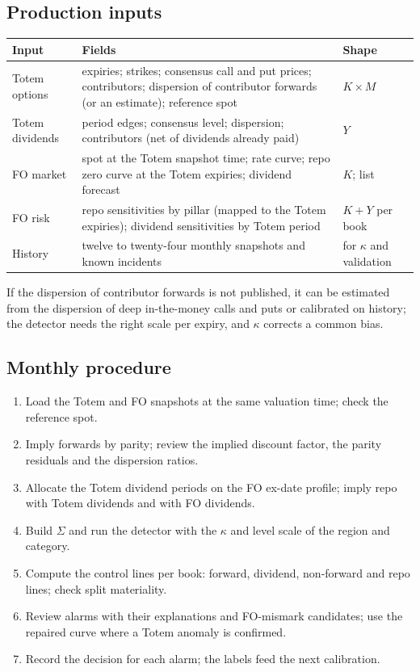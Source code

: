 \subsection{Production inputs}
\begin{center}\small
\begin{tabular}{p{2.4cm}p{10.0cm}p{2.4cm}}
\toprule
Input & Fields & Shape\\
\midrule
Totem options & expiries; strikes; consensus call and put prices; contributors; dispersion of contributor forwards (or an estimate); reference spot & $K\times M$\\
Totem dividends & period edges; consensus level; dispersion; contributors (net of dividends already paid) & $Y$\\
FO market & spot at the Totem snapshot time; rate curve; repo zero curve at the Totem expiries; dividend forecast & $K$; list\\
FO risk & repo sensitivities by pillar (mapped to the Totem expiries); dividend sensitivities by Totem period & $K+Y$ per book\\
History & twelve to twenty-four monthly snapshots and known incidents & for $\kappa$ and validation\\
\bottomrule
\end{tabular}
\end{center}
If the dispersion of contributor forwards is not published, it can be estimated from the dispersion of deep in-the-money
calls and puts or calibrated on history; the detector needs the right scale per expiry, and $\kappa$ corrects a common
bias.

\subsection{Monthly procedure}
\begin{enumerate}
\item Load the Totem and FO snapshots at the same valuation time; check the reference spot.
\item Imply forwards by parity; review the implied discount factor, the parity residuals and the dispersion ratios.
\item Allocate the Totem dividend periods on the FO ex-date profile; imply repo with Totem dividends and with FO dividends.
\item Build $\Sigma$ and run the detector with the $\kappa$ and level scale of the region and category.
\item Compute the control lines per book: forward, dividend, non-forward and repo lines; check split materiality.
\item Review alarms with their explanations and FO-mismark candidates; use the repaired curve where a Totem anomaly is confirmed.
\item Record the decision for each alarm; the labels feed the next calibration.
\end{enumerate}

